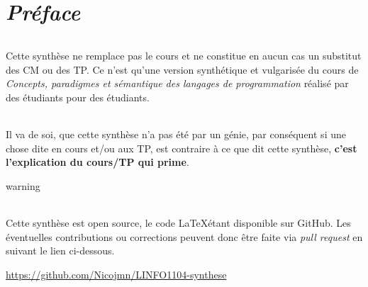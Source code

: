 \chapter*{\textbf{\textit{Préface}}}
    
    \subparagraph{}Cette synthèse ne remplace pas le cours et ne constitue en aucun cas un substitut des CM ou des TP. Ce n'est qu'une version synthétique 
    et vulgarisée du cours de \textit{Concepts, paradigmes et sémantique des langages de programmation} réalisé par des étudiants pour des étudiants.

    \subparagraph{}Il va de soi, que cette synthèse n'a pas été par un génie, par conséquent si une chose dite en cours et/ou aux TP, est 
    contraire à ce que dit cette synthèse, \textbf{c’est l’explication du cours/TP qui prime}.

    \vfill
    \begin{tbox}{warning}
        \subparagraph{}Cette synthèse est open source, le code \LaTeX\;étant disponible sur GitHub. Les éventuelles contributions ou corrections peuvent
        donc être faite via \textit{pull request} en suivant le lien ci-dessous.
        \tcblower
        \begin{center}
            \href{https://github.com/Nicojmn/LINFO1104-synthese}
            {https://github.com/Nicojmn/LINFO1104-synthese}
        \end{center}
    \end{tbox}
    \vfill